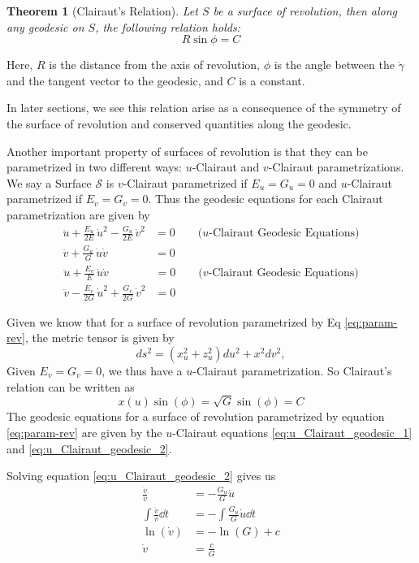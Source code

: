 \documentclass[12pt]{article}
\newtheorem{theorem}[definition]{Theorem}
\begin{document}
\begin{theorem}[Clairaut's Relation]
Let \(S\) be a surface of revolution, then along any geodesic on \(S\), the following relation holds:
\[
R\sin\phi = C
\]
\end{theorem}
Here, \(R\) is the distance from the axis of revolution, \(\phi\) is the angle between the $\dot{\gamma}$ and the tangent vector to the geodesic, and \(C\) is a constant.

In later sections, we see this relation arise as a consequence of the symmetry of the surface of revolution and conserved quantities along the geodesic.

Another important property of surfaces of revolution is that they can be parametrized in two different ways: \(u\)-Clairaut and \(v\)-Clairaut parametrizations.
We say a Surface $\mathcal{S}$ is $v$-Clairaut parametrized if $E_{u} = G_{u} = 0$ and $u$-Clairaut parametrized if $E_{v} = G_{v} = 0$.
Thus the geodesic equations for each Clairaut parametrization are given by
\begin{align}
    \ddot{u} + \frac{E_{u}}{2E}\,\dot{u}^2 - \frac{G_{u}}{2E}\,\dot{v}^{2} &= 0 \qquad (u\text{-Clairaut Geodesic Equations)} \label{eq:u_Clairaut_geodesic_1}\\
    \ddot{v} + \frac{G_{u}}{G}\,\dot{u}\dot{v} &= 0 \label{eq:u_Clairaut_geodesic_2}
\end{align}
\begin{align}
    \ddot{u} + \frac{E_{v}}{E}\,\dot{u}\dot{v} &= 0 \qquad (v\text{-Clairaut Geodesic Equations)} \label{eq:v_Clairaut_geodesic_1}\\
    \ddot{v} - \frac{E_{v}}{2G}\,\dot{u}^2 + \frac{G_{v}}{2G}\,\dot{v}^2 &= 0 \label{eq:v_Clairaut_geodesic_2}
\end{align}

Given we know that for a surface of revolution parametrized by Eq \eqref{eq:param-rev}, the metric tensor is given by
\[
    ds^2 = \left( x_{u}^2 + z_u^2 \right) du^2 + x^2 dv^2,
\]
Given $E_v = G_v = 0$, we thus have a $u$-Clairaut parametrization.
So Clairaut's relation can be written as
\begin{equation} \label{eq:Clairaut_relation_u}
    x(u) \sin(\phi) = \sqrt{G} \sin(\phi) = C
\end{equation}
The geodesic equations for a surface of revolution parametrized by equation \eqref{eq:param-rev} are given by the $u$-Clairaut equations \eqref{eq:u_Clairaut_geodesic_1} and \eqref{eq:u_Clairaut_geodesic_2}.

Solving equation \eqref{eq:u_Clairaut_geodesic_2} gives us
\begin{align*}
    \frac{\ddot{v}}{\dot{v}} &= -\frac{G_{u}}{G}\dot{u} \\
    \int \frac{\ddot{v}}{\dot{v}} \dd{t} &= -\int \frac{G_{u}}{G}\dot{u} \dd{t} \\
    \ln(\dot{v}) &= -\ln(G) + c \\
    \dot{v} &= \frac{c}{G}
\end{align*}
\end{document}

